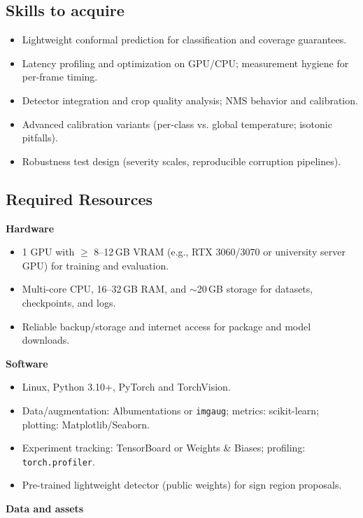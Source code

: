 \documentclass[11pt,a4paper]{article}
\begin{document}
\subsection{Skills to acquire}
\begin{itemize}
  \item Lightweight conformal prediction for classification and coverage guarantees.
  \item Latency profiling and optimization on GPU/CPU; measurement hygiene for per-frame timing.
  \item Detector integration and crop quality analysis; NMS behavior and calibration.
  \item Advanced calibration variants (per-class vs. global temperature; isotonic pitfalls).
  \item Robustness test design (severity scales, reproducible corruption pipelines).
\end{itemize}

\subsection{Required Resources}

\textbf{Hardware}

\begin{itemize}
  \item 1 GPU with $\geq$ 8--12\,GB VRAM (e.g., RTX 3060/3070 or university server GPU) for training and evaluation.
  \item Multi-core CPU, 16--32\,GB RAM, and $\sim$20\,GB storage for datasets, checkpoints, and logs.
  \item Reliable backup/storage and internet access for package and model downloads.
\end{itemize}

\textbf{Software}

\begin{itemize}
  \item Linux, Python 3.10+, PyTorch and TorchVision.
  \item Data/augmentation: Albumentations or \texttt{imgaug}; metrics: scikit-learn; plotting: Matplotlib/Seaborn.
  \item Experiment tracking: TensorBoard or Weights \& Biases; profiling: \texttt{torch.profiler}.
  \item Pre-trained lightweight detector (public weights) for sign region proposals.
\end{itemize}

\textbf{Data and assets}
\end{document}
